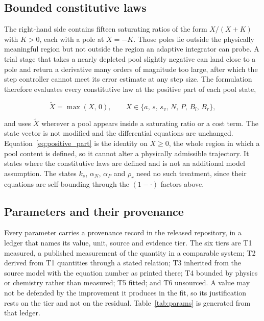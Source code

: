 \subsection{Bounded constitutive laws}
\label{sec:bounded}

The right-hand side contains fifteen saturating ratios of the form $X/(X+K)$ with
$K>0$, each with a pole at $X = -K$. Those poles lie outside the physically
meaningful region but not outside the region an adaptive integrator can probe. A
trial stage that takes a nearly depleted pool slightly negative can land close to a
pole and return a derivative many orders of magnitude too large, after which the
step controller cannot meet its error estimate at any step size. The formulation
therefore evaluates every constitutive law at the positive part of each pool state,

\begin{equation}
\widetilde{X} = \max(X,\,0),
\qquad X \in \{a,\,s,\,s_v,\,N,\,P,\,B_l,\,B_r\},
\label{eq:positive_part}
\end{equation}

and uses $\widetilde{X}$ wherever a pool appears inside a saturating ratio or a
cost term. The state vector is not modified and the differential equations are
unchanged. Equation~\eqref{eq:positive_part} is the identity on $X \geq 0$, the
whole region in which a pool content is defined, so it cannot alter a physically
admissible trajectory. It states where the constitutive laws are defined and is
not an additional model assumption. The states $k_s$, $\alpha_N$, $\alpha_P$ and
$\rho_r$ need no such treatment, since their equations are self-bounding through
the $(1-\cdot)$ factors above.

\subsection{Parameters and their provenance}
\label{sec:params}

Every parameter carries a provenance record in the released repository, in a ledger
that names its value, unit, source and evidence tier. The six tiers are T1
measured, a published measurement of the quantity in a comparable system; T2
derived from T1 quantities through a stated relation; T3 inherited from the source
model with the equation number as printed there; T4 bounded by physics or chemistry
rather than measured; T5 fitted; and T6 unsourced. A value may not be defended by
the improvement it produces in the fit, so its justification rests on the tier and
not on the residual. Table~\ref{tab:params} is generated from that ledger.

